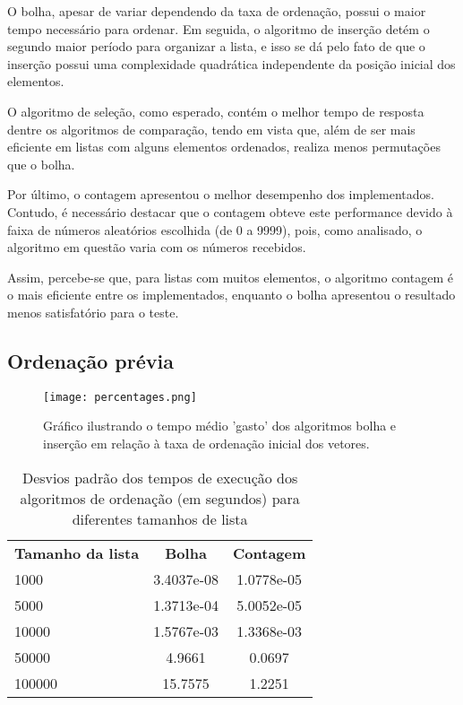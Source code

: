O bolha, apesar de variar dependendo da taxa de ordenação, possui o maior tempo necessário para ordenar. Em seguida, o algoritmo de inserção detém o segundo maior período para organizar a lista, e isso se dá pelo fato de que o inserção possui uma complexidade quadrática independente da posição inicial dos elementos. 

O algoritmo de seleção, como esperado, contém o melhor tempo de resposta dentre os algoritmos de comparação, tendo em vista que, além de ser mais eficiente em listas com alguns elementos ordenados, realiza menos permutações que o bolha. 

Por último, o contagem apresentou o melhor desempenho dos implementados. Contudo, é necessário destacar que o contagem obteve este performance devido à faixa de números aleatórios escolhida (de 0 a 9999), pois, como analisado, o algoritmo em questão varia com os números recebidos.

Assim, percebe-se que, para listas com muitos elementos, o algoritmo contagem é o mais eficiente entre os implementados, enquanto o bolha apresentou o resultado menos satisfatório para o teste.


\subsection{Ordenação prévia}
\begin{figure}[h]
    \texttt{[image: percentages.png]}
    \caption{Gráfico ilustrando o tempo médio 'gasto' dos algoritmos bolha e inserção em relação à taxa de ordenação inicial dos vetores.}
\end{figure}
\begin{table}[h]
    \begin{tabular}{lcc}
        \textbf{Tamanho da lista} & \textbf{Bolha} & \textbf{Contagem} \\
        1000 & 3.4037e-08 & 1.0778e-05 \\
        5000 & 1.3713e-04 & 5.0052e-05 \\
        10000 & 1.5767e-03 & 1.3368e-03 \\
        50000 & 4.9661 & 0.0697 \\
        100000 & 15.7575 & 1.2251 \\
    \end{tabular}
    \caption{Desvios padrão dos tempos de execução dos algoritmos de ordenação (em segundos) para diferentes tamanhos de lista}
    \label{tab:desvios_algoritmos}
\end{table}

